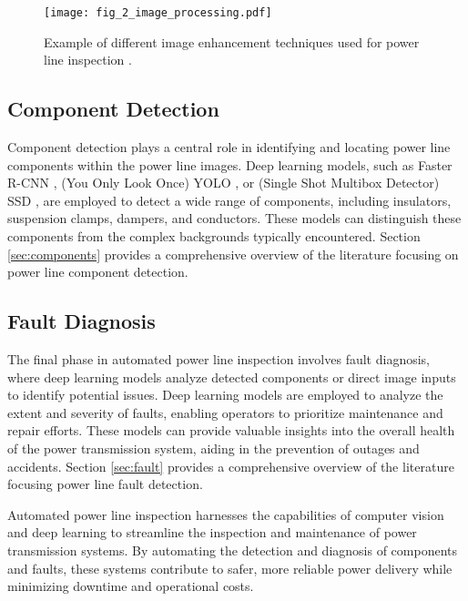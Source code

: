 \begin{figure}[htb]
    \centering
    \texttt{[image: fig\_2\_image\_processing.pdf]}
    \caption{Example of different image enhancement techniques used for power line inspection \cite{liu_data_2020}.}
    \label{fig:image_processing}
\end{figure}

\subsection{Component Detection}
Component detection plays a central role in identifying and locating power line components within the power line images. Deep learning models, such as Faster R-CNN \cite{girshick_rich_2014}, (You Only Look Once) YOLO \cite{redmon_you_2016}, or (Single Shot Multibox Detector) SSD \cite{liu_ssd_2016}, are employed to detect a wide range of components, including insulators, suspension clamps, dampers, and conductors. These models can distinguish these components from the complex backgrounds typically encountered. Section \ref{sec:components} provides a comprehensive overview of the literature focusing on power line component detection.

\subsection{Fault Diagnosis}
The final phase in automated power line inspection involves fault diagnosis, where deep learning models analyze detected components or direct image inputs to identify potential issues. Deep learning models are employed to analyze the extent and severity of faults, enabling operators to prioritize maintenance and repair efforts. These models can provide valuable insights into the overall health of the power transmission system, aiding in the prevention of outages and accidents. Section \ref{sec:fault} provides a comprehensive overview of the literature focusing power line fault detection.

Automated power line inspection harnesses the capabilities of computer vision and deep learning to streamline the inspection and maintenance of power transmission systems. By automating the detection and diagnosis of components and faults, these systems contribute to safer, more reliable power delivery while minimizing downtime and operational costs.